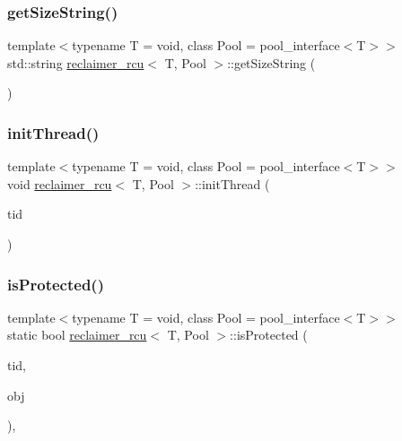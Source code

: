 \mbox{\label{classreclaimer__rcu_a4693be247dba56a115a04ebb1737d715}} 
\subsubsection{\texorpdfstring{get\+Size\+String()}{getSizeString()}}
{\footnotesize\ttfamily template$<$typename T  = void, class Pool  = pool\+\_\+interface$<$\+T$>$$>$ \\
std\+::string \hyperlink{classreclaimer__rcu}{reclaimer\+\_\+rcu}$<$ T, Pool $>$\+::get\+Size\+String (\begin{DoxyParamCaption}{ }\end{DoxyParamCaption})\hspace{0.3cm}{\ttfamily [inline]}}

\mbox{\label{classreclaimer__rcu_a6b9241339f5715c9c6c6cce62a886411}} 
\subsubsection{\texorpdfstring{init\+Thread()}{initThread()}}
{\footnotesize\ttfamily template$<$typename T  = void, class Pool  = pool\+\_\+interface$<$\+T$>$$>$ \\
void \hyperlink{classreclaimer__rcu}{reclaimer\+\_\+rcu}$<$ T, Pool $>$\+::init\+Thread (\begin{DoxyParamCaption}\item[{const int}]{tid }\end{DoxyParamCaption})\hspace{0.3cm}{\ttfamily [inline]}}

\mbox{\label{classreclaimer__rcu_a8b63d95c4391b2ee2f36c74a2141d078}} 
\subsubsection{\texorpdfstring{is\+Protected()}{isProtected()}}
{\footnotesize\ttfamily template$<$typename T  = void, class Pool  = pool\+\_\+interface$<$\+T$>$$>$ \\
static bool \hyperlink{classreclaimer__rcu}{reclaimer\+\_\+rcu}$<$ T, Pool $>$\+::is\+Protected (\begin{DoxyParamCaption}\item[{const int}]{tid,  }\item[{T $\ast$const}]{obj }\end{DoxyParamCaption})\hspace{0.3cm}{\ttfamily [inline]}, {\ttfamily [static]}}

